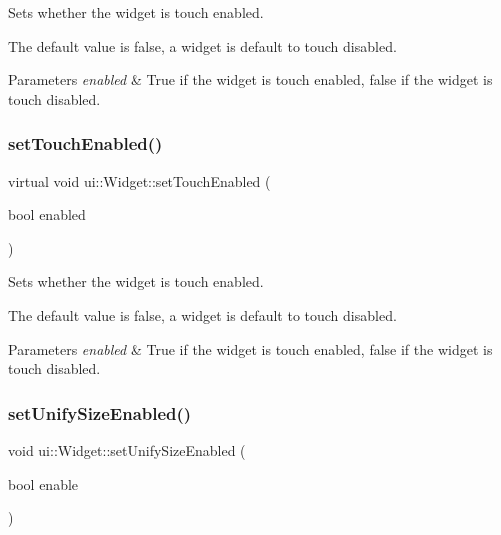 Sets whether the widget is touch enabled.

The default value is false, a widget is default to touch disabled.


\begin{DoxyParams}{Parameters}
{\em enabled} & True if the widget is touch enabled, false if the widget is touch disabled. \\
\hline
\end{DoxyParams}
\mbox{\label{classui_1_1Widget_a2d86c544e0f0d5b8013f4cca88b3f321}} 
\subsubsection{\texorpdfstring{set\+Touch\+Enabled()}{setTouchEnabled()}\hspace{0.1cm}{\footnotesize\ttfamily [2/2]}}
{\footnotesize\ttfamily virtual void ui\+::\+Widget\+::set\+Touch\+Enabled (\begin{DoxyParamCaption}\item[{bool}]{enabled }\end{DoxyParamCaption})\hspace{0.3cm}{\ttfamily [virtual]}}

Sets whether the widget is touch enabled.

The default value is false, a widget is default to touch disabled.


\begin{DoxyParams}{Parameters}
{\em enabled} & True if the widget is touch enabled, false if the widget is touch disabled. \\
\hline
\end{DoxyParams}
\mbox{\label{classui_1_1Widget_a95c1265f951f97e9d7088f26ba745ff4}} 
\subsubsection{\texorpdfstring{set\+Unify\+Size\+Enabled()}{setUnifySizeEnabled()}\hspace{0.1cm}{\footnotesize\ttfamily [1/2]}}
{\footnotesize\ttfamily void ui\+::\+Widget\+::set\+Unify\+Size\+Enabled (\begin{DoxyParamCaption}\item[{bool}]{enable }\end{DoxyParamCaption})}


